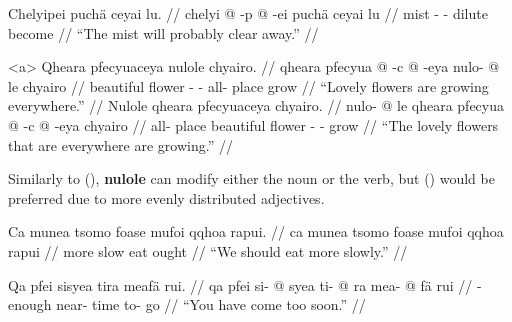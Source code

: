 \documentclass{article}
\begin{document}
\ex[lingstyle=QuCheanya] \begingl
\glpreamble Chelyipei puch\"a ceyai lu. //
\gla chelyi @ -p @ -ei puch\"a ceyai lu //
\glb mist - - dilute become  //
\glft ``The mist will probably clear away.'' //
\endgl \xe

\pex[lingstyle=QuCheanya,tag=flowers] 
\a<a> \begingl
\glpreamble Qheara pfecyuaceya nulole chyairo. //
\gla qheara pfecyua @ -c @ -eya nulo- @ le chyairo //
\glb beautiful flower - - all- place grow //
\glft ``Lovely flowers are growing everywhere.'' //
\endgl
\a \begingl
\glpreamble Nulole qheara pfecyuaceya chyairo. //
\gla nulo- @ le qheara pfecyua @ -c @ -eya chyairo //
\glb all- place beautiful flower - - grow //
\glft ``The lovely flowers that are everywhere are growing.'' //
\endgl
\xe

Similarly to (), \textbf{nulole} can modify either the noun or the verb, but () would be preferred due to more evenly distributed adjectives.

\ex[lingstyle=QuCheanya] \begingl
\glpreamble Ca munea tsomo foase mufoi qqhoa rapui. //
\gla ca munea tsomo foase mufoi qqhoa rapui //
\glb {}  more slow eat  ought //
\glft ``We should eat more slowly.'' //
\endgl \xe

\ex[lingstyle=QuCheanya] \begingl
\glpreamble Qa pfei sisyea tira meaf\"a rui. //
\gla qa pfei si- @ syea ti- @ ra mea- @ f\"a rui //
\glb {}  - enough near- time to- go  //
\glft ``You have come too soon.'' //
\endgl \xe
\end{document}
